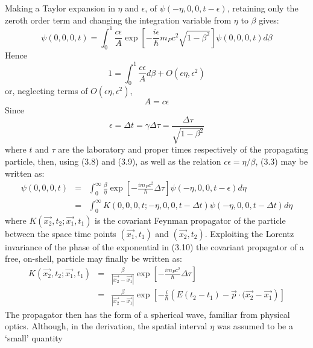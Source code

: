 {  Making a Taylor expansion in $\eta$ and $\epsilon$, of  $\psi(-\eta, 0,0,t-\epsilon)$,
  retaining only the zeroth order term and changing the integration variable from $\eta$ to 
  $\beta$ gives:
  \begin{equation}
   \psi(0,0,0,t) =  \int_0^1 \frac{c\epsilon}{A} \exp\left[
  -\frac{i \epsilon}{\hbar}m_P c^2\sqrt{1-\beta^2}\right] \psi(0,0,0,t) d\beta
 \end{equation}
  Hence 
  \begin{equation}
 1 =   \int_0^1 \frac{c\epsilon}{A}d\beta +O(\epsilon \eta,\epsilon^2)
 \end{equation}
   or, neglecting terms of $O(\epsilon \eta,\epsilon^2)$,
  \begin{equation}
   A= c \epsilon
 \end{equation}
  Since 
 \begin{equation}
 \epsilon = \Delta t = \gamma  \Delta \tau = \frac{\Delta \tau}{\sqrt{1-\beta^2}}
 \end{equation}
 where $t$ and $\tau$ are the laboratory and proper times respectively of the propagating
  particle, then, using  (3.8) and (3.9), as well as the relation $c \epsilon = \eta/\beta$, (3.3)
  may be written as:
 \begin{eqnarray}
   \psi(0,0,0,t) & = & \int_0^{\infty} \frac{\beta}{\eta} \exp\left[
  -\frac{i m_P c^2}{\hbar} \Delta  \tau\right] \psi(-\eta,0,0,t-\epsilon) d\eta
  \nonumber \\
    & = & \int_0^{\infty} K(0,0,0,t;-\eta,0,0,t-\Delta t) \psi(-\eta,0,0,t-\Delta t)d\eta 
 \end{eqnarray}
  where $K(\vec{x_2},t_2; \vec{x_1},t_1)$ is the covariant Feynman propagator
 of the particle between the space time points $(\vec{x_1},t_1)$ and $(\vec{x_2},t_2)$.
  Exploiting the Lorentz invariance of the phase of the exponential in (3.10) the
  covariant propagator of a free, on-shell, particle may finally be written as:
   \begin{eqnarray}
    K(\vec{x_2},t_2; \vec{x_1},t_1) & = &  \frac{\beta}{|\vec{x_2}-\vec{x_1}|}
 \exp\left[-\frac{i m_P c^2}{\hbar} \Delta  \tau\right] \nonumber \\
   & = & \frac{\beta}{|\vec{x_2}-\vec{x_1}|}
 \exp\left[-\frac{i}{\hbar}\left(E(t_2-t_1)-\vec{p}\cdot(\vec{x_2}-\vec{x_1}\right)\right]
 \end{eqnarray}
  The propagator then has the form of a spherical wave, familiar from physical optics.
 Although, in the derivation, the spatial interval $\eta$ was assumed to be a `small' quantity
}
